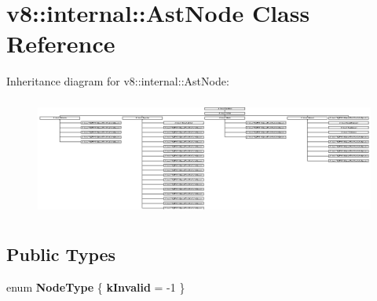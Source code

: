\hypertarget{classv8_1_1internal_1_1_ast_node}{}\section{v8\+:\+:internal\+:\+:Ast\+Node Class Reference}
\label{classv8_1_1internal_1_1_ast_node}
Inheritance diagram for v8\+:\+:internal\+:\+:Ast\+Node\+:\begin{figure}[H]
\begin{center}
\leavevmode
\includegraphics[height=3.928571cm]{classv8_1_1internal_1_1_ast_node}
\end{center}
\end{figure}
\subsection*{Public Types}
\begin{DoxyCompactItemize}
\item 
\hypertarget{classv8_1_1internal_1_1_ast_node_ab81d3ee3986451cb591842b06c4ee3bc}{}enum {\bfseries Node\+Type} \{ {\bfseries k\+Invalid} = -\/1
 \}\label{classv8_1_1internal_1_1_ast_node_ab81d3ee3986451cb591842b06c4ee3bc}

\end{DoxyCompactItemize}
